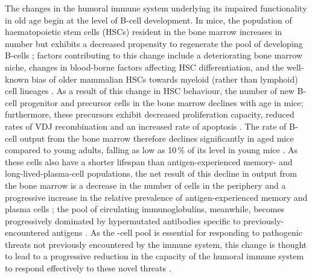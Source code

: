 The changes in the humoral immune system underlying its impaired functionality in old age begin at the level of B-cell development. In mice, the population of haematopoietic stem cells (HSCs) resident in the bone marrow increases in number but exhibits a decreased propensity to regenerate the pool of developing B-cells \parencite{ademokun2010ageing,kogut2012bcells}; factors contributing to this change include a deteriorating bone marrow niche, changes in blood-borne factors affecting HSC differentiation, and the well-known bias of older mammalian HSCs towards myeloid (rather than lymphoid) cell lineages \parencite{kogut2012bcells,dunnwalters2010bcellageing}. As a result of this change in HSC behaviour, the number of new B-cell progenitor and precursor cells in the bone marrow declines with age in mice; furthermore, these precursors exhibit decreased proliferation capacity, reduced rates of VDJ recombination and an increased rate of apoptosis \parencite{montecino2013immunosenescence,kogut2012bcells,labrie2004bone}. The rate of B-cell output from the bone marrow therefore declines significantly in aged mice compared to young adults, falling as low as 10\,\% of its level in young mice \parencite{kogut2012bcells}. As these \naive cells also have a shorter lifespan than antigen-experienced memory- and long-lived-plasma-cell populations, the net result of this decline in output from the bone marrow is a decrease in the number of \naive cells in the periphery and a progressive increase in the relative prevalence of antigen-experienced memory and plasma cells \parencite{mehr2011reversing,kogut2012bcells}; the pool of circulating immunoglobulins, meanwhile, becomes progressively dominated by hypermutated antibodies specific to previously-encountered antigens \parencite{kogut2012bcells}. As the \naive{}-cell pool is essential for responding to pathogenic threats not previously encountered by the immune system, this change is thought to lead to a progressive reduction in the capacity of the humoral immune system to respond effectively to these novel threats \parencite{kogut2012bcells}.


